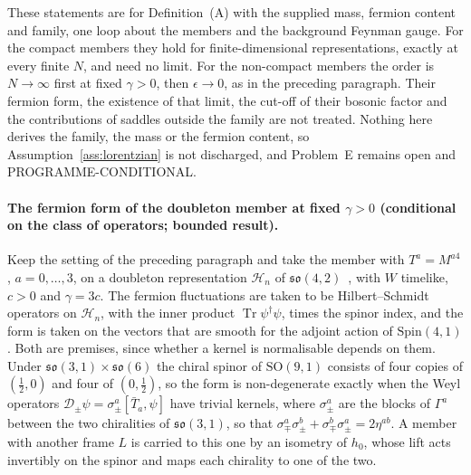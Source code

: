 These statements are for Definition~(A) with the supplied mass, fermion content and family, one loop about the members and the background Feynman gauge. For the compact members they hold for finite-dimensional representations, exactly at every finite \(N\), and need no limit. For the non-compact members the order is \(N\to\infty\) first at fixed \(\gamma>0\), then \(\epsilon\to0\), as in the preceding paragraph. Their fermion form, the existence of that limit, the cut-off of their bosonic factor and the contributions of saddles outside the family are not treated. Nothing here derives the family, the mass or the fermion content, so Assumption~\ref{ass:lorentzian} is not discharged, and Problem~E remains open and PROGRAMME-CONDITIONAL.

\paragraph{The fermion form of the doubleton member at fixed \(\gamma>0\) (conditional on the class of operators; bounded result).}
Keep the setting of the preceding paragraph and take the member with \(T^a=M^{a4}\), \(a=0,\dots,3\), on a doubleton representation \(\mathcal H_n\) of \(\mathfrak{so}(4,2)\)~\cite{MantaSteinacker2025}, with \(W\) timelike, \(c>0\) and \(\gamma=3c\). The fermion fluctuations are taken to be Hilbert--Schmidt operators on \(\mathcal H_n\), with the inner product \(\operatorname{Tr}\psi^\dagger\psi\), times the spinor index, and the form is taken on the vectors that are smooth for the adjoint action of \(\mathrm{Spin}(4,1)\). Both are premises, since whether a kernel is normalisable depends on them. Under \(\mathfrak{so}(3,1)\times\mathfrak{so}(6)\) the chiral spinor of \(\mathrm{SO}(9,1)\) consists of four copies of \((\tfrac12,0)\) and four of \((0,\tfrac12)\), so the form is non-degenerate exactly when the Weyl operators \(\mathcal D_\pm\psi=\sigma_\pm^a[\bar T_a,\psi]\) have trivial kernels, where \(\sigma_\pm^a\) are the blocks of \(\Gamma^a\) between the two chiralities of \(\mathfrak{so}(3,1)\), so that \(\sigma_\mp^a\sigma_\pm^b+\sigma_\mp^b\sigma_\pm^a=2\eta^{ab}\). A member with another frame \(L\) is carried to this one by an isometry of \(h_0\), whose lift acts invertibly on the spinor and maps each chirality to one of the two.

